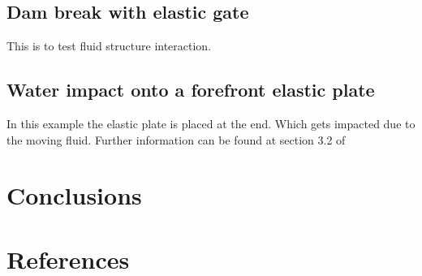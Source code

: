 \documentclass[preprint,12pt]{elsarticle}
\begin{document}
\subsection{Dam break with elastic gate}
\label{sec:dam-break-elastic-gate}

This is to test fluid structure interaction.


\subsection{Water impact onto a forefront elastic plate}
\label{sec:water-impact-forefront}

In this example the elastic plate is placed at the end. Which gets
impacted due to the moving fluid. Further information can be found at
section 3.2 of \cite{liu2013numerical}


\section{Conclusions}
\label{sec:conclusions}


\section*{References}


\end{document}
